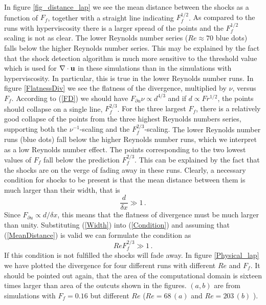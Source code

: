 In figure \ref{fig_distance_lap} we see the mean distance between the shocks as a function of $ F_f $, together with a straight line indicating $ F_f^{1/2} $. { As compared to the runs with hyperviscosity there is a larger spread of the points and the $ F_f^{1/2} $ scaling is not as clear. The lower Reynolds number series ($ Re \approx 70 $ blue dots) falls below the higher Reynolds number series. This may be explained by the fact that the shock detection algorithm is much more sensitive to the threshold value which is used for $ \nabla \cdot {\bf u} $ in these simulations than in the simulations with hyperviscosity.  In particular, this is true in the lower Reynolds number runs. } In figure \ref{FlatnessDiv} we see the flatness of the divergence, multiplied by $ \nu $, versus $ F_f $. According to (\ref{FD}) we should have $ F_{\partial u} \nu \propto  d^{4/3} $ and if $ d \propto Fr^{1/2} $, the points should collapse on a single line, $ F_f^{2/3} $.  {For the three largest $ F_f $, there is a relatively good collapse of the points from the three highest  Reynolds numbers series, supporting both the $ \nu^{-1} $-scaling and the $ F_f^{2/3} $-scaling. }
 The lower Reynolds number runs (blue dots) fall below the higher Reynolds number runs, which we interpret as a low Reynolds number effect. The points corresponding to the two lowest values of $ F_f $ fall below the prediction $ F_f^{2/3} $. This can be explained by the fact that the shocks are on the verge of fading away in these runs. Clearly, a necessary condition for shocks to be present is that the mean distance between them is much larger than their  width, that is
\begin{equation} \label{Condition}
\frac{d}{\delta x} \gg  1\, .
\end{equation}
Since $ F_{\partial u} \propto d/\delta x $, this means that the flatness of divergence must be much larger than unity. Substituting (\ref{Width}) into (\ref{Condition})  and assuming that (\ref{MeanDistance}) is valid we can formulate the condition as
\begin{equation}  \label{SCond}
Re F_f^{2/3} \gg 1 \, .
\end{equation}
If this condition is not fulfilled the shocks will fade away.  In figure
\ref{Physical_lap} we have plotted the divergence for four different runs with
different $ Re $ and $ F_f $. It should be pointed out again, that the area of
the computational domain is sixteen times larger than area of the outcuts shown
in the figures.  $(a,b)$ are from simulations with  $ F_f = 0.16 $ but
different $ Re $ ($ Re = 68\, (a) $ and { $ Re = 203\, (b) $ }).
